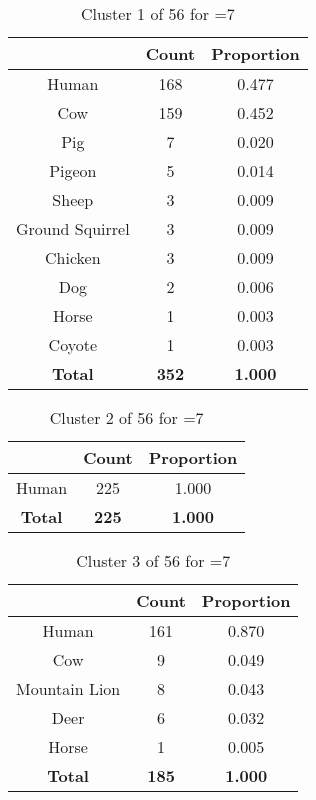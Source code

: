 \begin{table}[ht!]
\centering
\begin{tabular}{|c|c|c|}
\hline
\bf \Spec{} &\bf Count &\bf Proportion\\ \hline \hline
Human & 168 & 0.477\\ \hline
Cow & 159 & 0.452\\ \hline
Pig & 7 & 0.020\\ \hline
Pigeon & 5 & 0.014\\ \hline
Sheep & 3 & 0.009\\ \hline
Ground Squirrel & 3 & 0.009\\ \hline
Chicken & 3 & 0.009\\ \hline
Dog & 2 & 0.006\\ \hline
Horse & 1 & 0.003\\ \hline
Coyote & 1 & 0.003\\ \hline
\hline
\bf Total & \bf 352 & \bf 1.000\\ \hline
\end{tabular}
\label{tab:cluster:1:7}
\caption{Cluster 1 of 56 for \minneigh{}=7}
\end{table}

\begin{table}[ht!]
\centering
\begin{tabular}{|c|c|c|}
\hline
\bf \Spec{} &\bf Count &\bf Proportion\\ \hline \hline
Human & 225 & 1.000\\ \hline
\hline
\bf Total & \bf 225 & \bf 1.000\\ \hline
\end{tabular}
\label{tab:cluster:2:7}
\caption{Cluster 2 of 56 for \minneigh{}=7}
\end{table}

\begin{table}[ht!]
\centering
\begin{tabular}{|c|c|c|}
\hline
\bf \Spec{} &\bf Count &\bf Proportion\\ \hline \hline
Human & 161 & 0.870\\ \hline
Cow & 9 & 0.049\\ \hline
Mountain Lion & 8 & 0.043\\ \hline
Deer & 6 & 0.032\\ \hline
Horse & 1 & 0.005\\ \hline
\hline
\bf Total & \bf 185 & \bf 1.000\\ \hline
\end{tabular}
\label{tab:cluster:3:7}
\caption{Cluster 3 of 56 for \minneigh{}=7}
\end{table}

